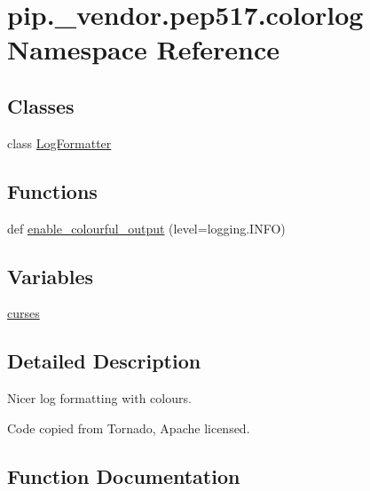 \hypertarget{namespacepip_1_1__vendor_1_1pep517_1_1colorlog}{}\section{pip.\+\_\+vendor.\+pep517.\+colorlog Namespace Reference}
\label{namespacepip_1_1__vendor_1_1pep517_1_1colorlog}
\subsection*{Classes}
\begin{DoxyCompactItemize}
\item 
class \hyperlink{classpip_1_1__vendor_1_1pep517_1_1colorlog_1_1LogFormatter}{Log\+Formatter}
\end{DoxyCompactItemize}
\subsection*{Functions}
\begin{DoxyCompactItemize}
\item 
def \hyperlink{namespacepip_1_1__vendor_1_1pep517_1_1colorlog_a67b28ee3ae06884ca9e1cf021442d8ea}{enable\+\_\+colourful\+\_\+output} (level=logging.\+I\+N\+FO)
\end{DoxyCompactItemize}
\subsection*{Variables}
\begin{DoxyCompactItemize}
\item 
\hyperlink{namespacepip_1_1__vendor_1_1pep517_1_1colorlog_a93b8906ebc83c75adcf63beb6c95d506}{curses}
\end{DoxyCompactItemize}


\subsection{Detailed Description}
\begin{DoxyVerb}Nicer log formatting with colours.

Code copied from Tornado, Apache licensed.
\end{DoxyVerb}
 

\subsection{Function Documentation}
\mbox{\label{namespacepip_1_1__vendor_1_1pep517_1_1colorlog_a67b28ee3ae06884ca9e1cf021442d8ea}} 

